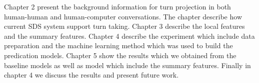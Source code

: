 Chapter 2 present the background information for turn projection in both human-human and human-computer conversations. The chapter describe how current SDS system support turn taking. 
Chapter 3 describe the local features and the summary features. Chapter 4 describe the experiment which include data preparation and the machine learning method which was used to build
the predication models. Chapter 5 show the results which we obtained from the baseline models as well as model which include the summary features. Finally in chapter 4 we discuss the results and present future work.   
